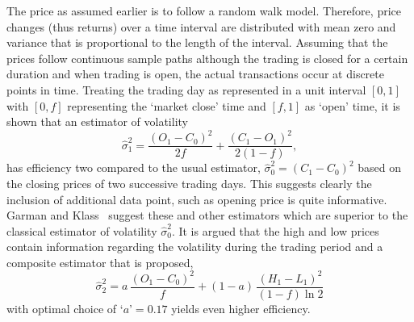 The price as assumed earlier is to follow a random walk model. Therefore, price changes (thus returns) over a time interval are distributed with mean zero and variance that is proportional to the length of the interval. Assuming that the prices follow continuous sample paths although the trading is closed for a certain duration and when trading is open, the actual transactions occur at discrete points in time. Treating the trading day as represented in a unit interval $[0,1]$ with $[0,f]$ representing the `market close' time and $[f,1]$ as `open' time, it is shown that an estimator of volatility
	\begin{equation} \label{eqn:estvol}
	\hat{\sigma}_1^2= \dfrac{(O_1 - C_0)^2}{2f} + \dfrac{(C_1 - O_1)^2}{2(1-f)},
	\end{equation}
has efficiency two compared to the usual estimator, $\hat{\sigma}^2_0=(C_1 - C_0)^2$ based on the closing prices of two successive trading days. This suggests clearly the inclusion of additional data point, such as opening price is quite informative. Garman and Klass~\cite{klass1980} suggest these and other estimators which are superior to the classical estimator of volatility $\hat{\sigma}^2_0$. It is argued that the high and low prices contain information regarding the volatility during the trading period and a composite estimator that is proposed,
	\begin{equation} \label{eqn:compositeest}
	\hat{\sigma}_2^2= a\,\dfrac{(O_1 - C_0)^2}{f} + (1-a)\, \dfrac{(H_1 - L_1)^2}{(1-f) \ln 2}
	\end{equation}
with optimal choice of `$a$'$=0.17$ yields even higher efficiency.


